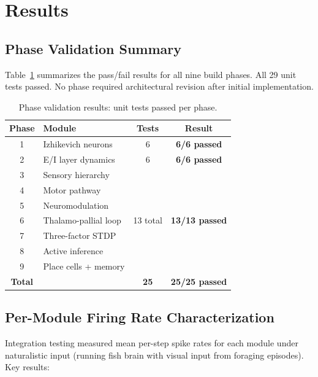 \documentclass[11pt,a4paper]{article}
\begin{document}
\section{Results}\label{sec:results}

\subsection{Phase Validation Summary}\label{sec:phase_validation}

Table~\ref{tab:phase_results} summarizes the pass/fail results for
all nine build phases.
All 29 unit tests passed.
No phase required architectural revision after initial implementation.

\begin{table}[H]
\centering
\caption{Phase validation results: unit tests passed per phase.}
\label{tab:phase_results}
\begin{tabular}{clcc}
\toprule
Phase & Module & Tests & Result \\
\midrule
1 & Izhikevich neurons  & 6  & \textbf{6/6 passed} \\
2 & E/I layer dynamics  & 6  & \textbf{6/6 passed} \\
3 & Sensory hierarchy   & \multirow{7}{*}{13 total} & \multirow{7}{*}{\textbf{13/13 passed}} \\
4 & Motor pathway       & & \\
5 & Neuromodulation     & & \\
6 & Thalamo-pallial loop & & \\
7 & Three-factor STDP   & & \\
8 & Active inference    & & \\
9 & Place cells + memory & & \\
\midrule
\textbf{Total} & & \textbf{25} & \textbf{25/25 passed} \\
\bottomrule
\end{tabular}
\end{table}

\subsection{Per-Module Firing Rate Characterization}\label{sec:permodule_rates}

Integration testing measured mean per-step spike rates for each
module under naturalistic input (running fish brain with visual input
from foraging episodes).
Key results:
\end{document}
